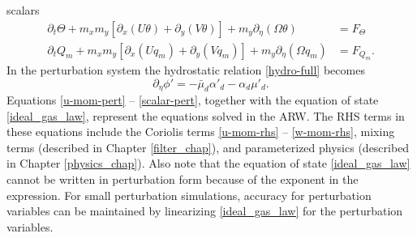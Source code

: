 scalars
\begin{align}
\partial_t \Theta
+ m_x m_y[\partial_x (U\theta) + \partial_y (V\theta)] + m_y \partial_\eta (\Omega \theta)
& = F_\Theta \\
%
\partial_t Q_m 
+ m_x m_y[\partial_x (U q_m) + \partial_y (V q_m)] + m_y \partial_\eta (\Omega q_m)
& = F_{Q_m}.
\label{scalar-pert}
\end{align}
%
\noindent
In the perturbation system
the hydrostatic relation \eqref{hydro-full} becomes
%
\begin{equation}
\partial_\eta \phi' =-\bar\mu_d \alpha'_d-\alpha_d\mu'_d.
\label{hydro-pert}
\end{equation}
%
Equations \eqref{u-mom-pert} -- \eqref{scalar-pert},
together with the equation of state \eqref{ideal_gas_law},
represent the equations solved in the ARW.
The RHS terms in these equations include the
Coriolis terms \eqref{u-mom-rhs} -- \eqref{w-mom-rhs},
mixing terms (described in Chapter \ref{filter_chap}), and
parameterized physics (described in Chapter \ref{physics_chap}).  
Also note that the equation of state \eqref{ideal_gas_law} cannot be
written in perturbation form because of the exponent in the expression.
For small perturbation simulations, accuracy for perturbation variables
can be maintained by linearizing \eqref{ideal_gas_law} for the
perturbation variables.
%


